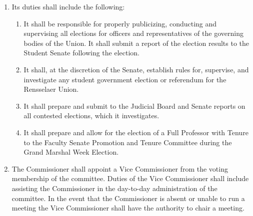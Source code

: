 \documentclass{uniondoc}
\begin{document}
\begin{enumerate}
\begin{enumerate}
\begin{enumerate}
			                  The group responsible for appointing a person to that membership shall forfeit its right to do so until the following semester.
			            \item All members must be Activity Fee paying students.
			                  All members, with the exception of the chair, shall serve through the end of the spring semester, until replaced, or until resigned, whichever comes first.
			                  The chair shall serve until they resign or are replaced.
			            \item Quorum for the Elections Commission shall be 2/3 of the total membership.
			            \item A member of the Elections Commission who is a candidate for Grand Marshal, President of the Union or joins a political party or is a candidate assistant, as defined by the Student Senate or the Elections Commission, will automatically be removed from the Elections Commission.
		            \end{enumerate}
		      \item Its duties shall include the following:
		            \begin{enumerate}
			            \item It shall be responsible for properly publicizing, conducting and supervising all elections for officers and representatives of the governing bodies of the Union.
			                  It shall submit a report of the election results to the Student Senate following the election.
			            \item It shall, at the discretion of the Senate, establish rules for, supervise, and investigate any student government election or referendum for the Rensselaer Union.
			            \item It shall prepare and submit to the Judicial Board and Senate reports on all contested elections, which it investigates.
			            \item It shall prepare and allow for the election of a Full Professor with Tenure to the Faculty Senate Promotion and Tenure Committee during the Grand Marshal Week Election.
		            \end{enumerate}
		      \item The Commissioner shall appoint a Vice Commissioner from the voting membership of the committee.
		            Duties of the Vice Commissioner shall include assisting the Commissioner in the day-to-day administration of the committee.
		            In the event that the Commissioner is absent or unable to run a meeting the Vice Commissioner shall have the authority to chair a meeting.

\end{enumerate}
\end{enumerate}
\end{document}

